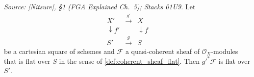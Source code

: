 \begin{lemma}
  \label{lem:coherent_flat_base_change}
  \textit{Source: [Nitsure], \S 1 (FGA Explained Ch.~5); Stacks 01U9.}
  Let
  \[
    \begin{array}{ccc}
      X' & \xrightarrow{\ g'\ } & X \\
      \downarrow f' & & \downarrow f \\
      S' & \xrightarrow{\ g\ } & S
    \end{array}
  \]
  be a cartesian square of schemes and \(\mathcal{F}\) a quasi-coherent sheaf
  of \(\mathcal{O}_X\)-modules that is flat over \(S\) in the sense of
  \cref{def:coherent_sheaf_flat}.  Then \(g'^* \mathcal{F}\) is flat over
  \(S'\).
\end{lemma}
